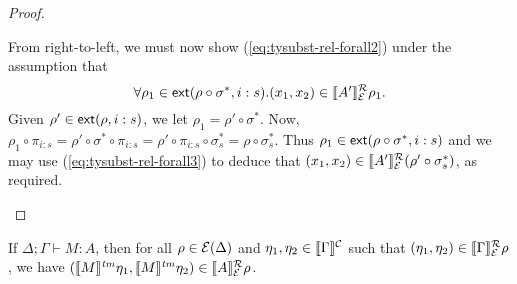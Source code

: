 \begin{proof}
\begin{enumerate}
\begin{description}
      From right-to-left, we must now show
      (\ref{eq:tysubst-rel-forall2}) under the assumption that
      \begin{equation}
        \label{eq:tysubst-rel-forall3}
        \forall \rho_1 \in \mathsf{ext}(\rho \circ \sigma^*,i:s). (x_1,x_2) \in \llbracket A' \rrbracket^{\mathcal{R}}_{\mathcal{E}}{\rho_1}.
      \end{equation}
      Given $\rho' \in \mathsf{ext}(\rho,i:s)$, we let $\rho_1 = \rho'
      \circ \sigma^*$. Now, $\rho_1 \circ \pi_{i:s} = \rho' \circ
      \sigma^* \circ \pi_{i:s} = \rho' \circ \pi_{i:s} \circ
      \sigma_s^{*} = \rho \circ \sigma_s^{*}$. Thus $\rho_1 \in
      \mathsf{ext}(\rho \circ \sigma^*,i:s)$ and we may use
      (\ref{eq:tysubst-rel-forall3}) to deduce that $(x_1,x_2) \in
      \llbracket A' \rrbracket^{\mathcal{R}}_{\mathcal{E}}{(\rho' \circ \sigma_s^{*})}$, as required.
    \end{description}
  \end{enumerate}
\end{proof}

\begin{restateTheorem}
  If $\Delta; \Gamma \vdash M : A$, then for all $\rho \in
  \mathcal{E}(\Delta)$ and $\eta_1, \eta_2 \in \llbracket \Gamma \rrbracket^{\mathcal{C}}$ such
  that $(\eta_1, \eta_2) \in \llbracket \Gamma \rrbracket^{\mathcal{R}}_{\mathcal{E}}{\rho}$, we have
  $(\llbracket M \rrbracket^{\mathit{tm}}\eta_1, \llbracket M \rrbracket^{\mathit{tm}}\eta_2) \in \llbracket A \rrbracket^{\mathcal{R}}_{\mathcal{E}}{\rho}$.
\end{restateTheorem}

